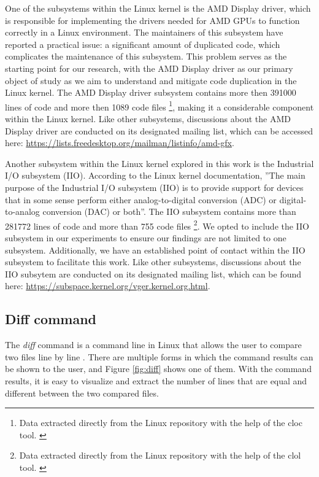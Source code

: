 One of the subsystems within the Linux kernel is the AMD Display driver, which
is responsible for implementing the drivers needed for AMD GPUs to function
correctly in a Linux environment. The maintainers of this subsystem have
reported a practical issue: a significant amount of duplicated code, which
complicates the maintenance of this subsystem. This problem serves as the
starting point for our research, with the AMD Display driver as our primary
object of study as we aim to understand and mitigate code duplication in the
Linux kernel. The AMD Display driver subsystem contains more then 391000 lines 
of code and more then 1089 code files
\footnote{ 
Data extracted directly from the Linux repository with the help of the cloc tool.
\citep{cloc}
}, 
making it a considerable component within the Linux kernel. Like other 
subsystems, discussions about the AMD Display driver are conducted on its 
designated mailing list, which can be accessed here: 
\url{https://lists.freedesktop.org/mailman/listinfo/amd-gfx}.

Another subsystem within the Linux kernel explored in this work is the
Industrial I/O subsystem (IIO). According to the Linux kernel documentation, 
''The main purpose of the Industrial I/O subsystem (IIO) is to provide support 
for devices that in some sense perform either analog-to-digital conversion (ADC) 
or digital-to-analog conversion (DAC) or both''\citep{iiodoc}. The IIO subsystem 
contains more than 281772 lines of code and more than 755 code files
\footnote{
Data extracted directly from the Linux repository with the help of the clol tool. \citep{cloc}
}.
We opted to include the IIO subsystem in our experiments to ensure our findings 
are not limited to one subsystem. Additionally, we have an established point of
contact within the IIO subsystem to facilitate this work.
Like other subsystems, discussions about the IIO subsytem are conducted on its 
designated mailing list, which can be found here: 
\url{https://subspace.kernel.org/vger.kernel.org.html}.


\subsection{Diff command}

The \textit{diff} command is a command line in Linux that allows the user to compare 
two files line by line \citep{diffcommand}. There are multiple forms in which the command 
results can be shown to the user, and Figure \ref{fig:diff} shows one of them. 
With the command results, it is easy to visualize and extract the number of lines that 
are equal and different between the two compared files.

